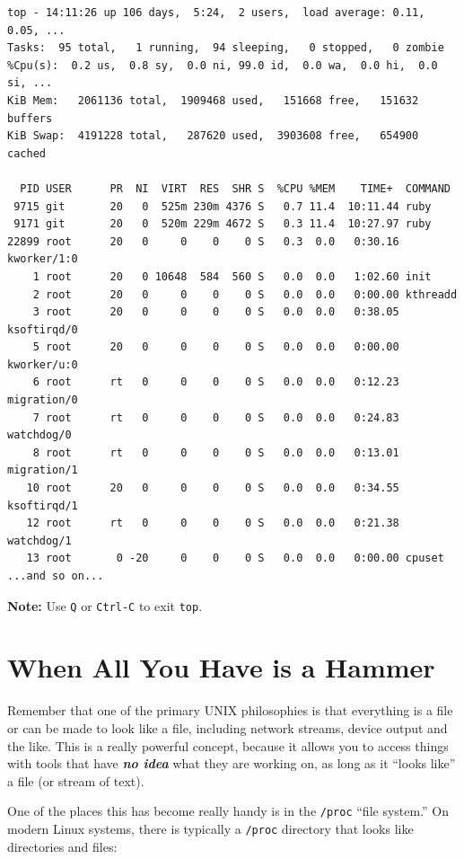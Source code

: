 \documentclass[10pt,]{book}
\numberwithin{figure}{chapter}
\begin{document}
\begin{verbatim}
top - 14:11:26 up 106 days,  5:24,  2 users,  load average: 0.11, 0.05, ...
Tasks:  95 total,   1 running,  94 sleeping,   0 stopped,   0 zombie
%Cpu(s):  0.2 us,  0.8 sy,  0.0 ni, 99.0 id,  0.0 wa,  0.0 hi,  0.0 si, ...
KiB Mem:   2061136 total,  1909468 used,   151668 free,   151632 buffers
KiB Swap:  4191228 total,   287620 used,  3903608 free,   654900 cached

  PID USER      PR  NI  VIRT  RES  SHR S  %CPU %MEM    TIME+  COMMAND
 9715 git       20   0  525m 230m 4376 S   0.7 11.4  10:11.44 ruby
 9171 git       20   0  520m 229m 4672 S   0.3 11.4  10:27.97 ruby
22899 root      20   0     0    0    0 S   0.3  0.0   0:30.16 kworker/1:0
    1 root      20   0 10648  584  560 S   0.0  0.0   1:02.60 init
    2 root      20   0     0    0    0 S   0.0  0.0   0:00.00 kthreadd
    3 root      20   0     0    0    0 S   0.0  0.0   0:38.05 ksoftirqd/0
    5 root      20   0     0    0    0 S   0.0  0.0   0:00.00 kworker/u:0
    6 root      rt   0     0    0    0 S   0.0  0.0   0:12.23 migration/0
    7 root      rt   0     0    0    0 S   0.0  0.0   0:24.83 watchdog/0
    8 root      rt   0     0    0    0 S   0.0  0.0   0:13.01 migration/1
   10 root      20   0     0    0    0 S   0.0  0.0   0:34.55 ksoftirqd/1
   12 root      rt   0     0    0    0 S   0.0  0.0   0:21.38 watchdog/1
   13 root       0 -20     0    0    0 S   0.0  0.0   0:00.00 cpuset
...and so on...
\end{verbatim}

\textbf{Note:} Use \texttt{Q} or \texttt{Ctrl-C} to exit \texttt{top}.

\section{When All You Have is a
Hammer}\label{when-all-you-have-is-a-hammer}

Remember that one of the primary UNIX philosophies is that everything is
a file or can be made to look like a file, including network streams,
device output and the like. This is a really powerful concept, because
it allows you to access things with tools that have \textbf{\emph{no
idea}} what they are working on, as long as it ``looks like'' a file (or
stream of text).

One of the places this has become really handy is in the \texttt{/proc}
``file system.'' On modern Linux systems, there is typically a
\texttt{/proc} directory that looks like directories and files:
\end{document}
